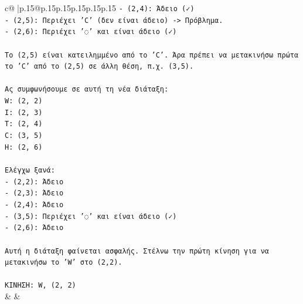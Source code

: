 \documentclass{article}
\begin{document}
{\begin{supertabular}{c@{$\;$}|p{.15\linewidth}@{}p{.15\linewidth}p{.15\linewidth}p{.15\linewidth}p{.15\linewidth}p{.15\linewidth}}
{{{\texttt{{-} (2,4): Άδειο (✓)} \\
\texttt{{-} (2,5): Περιέχει 'C' (δεν είναι άδειο) {-}> Πρόβλημα.} \\
\texttt{{-} (2,6): Περιέχει '◌' και είναι άδειο (✓)} \\
\\ 
\texttt{Το (2,5) είναι κατειλημμένο από το 'C'. Άρα πρέπει να μετακινήσω πρώτα το 'C' από το (2,5) σε άλλη θέση, π.χ. (3,5).} \\
\\ 
\texttt{Ας συμφωνήσουμε σε αυτή τη νέα διάταξη:} \\
\texttt{W: (2, 2)} \\
\texttt{I: (2, 3)} \\
\texttt{T: (2, 4)} \\
\texttt{C: (3, 5)} \\
\texttt{H: (2, 6)} \\
\\ 
\texttt{Ελέγχω ξανά:} \\
\texttt{{-} (2,2): Άδειο} \\
\texttt{{-} (2,3): Άδειο} \\
\texttt{{-} (2,4): Άδειο} \\
\texttt{{-} (3,5): Περιέχει '◌' και είναι άδειο (✓)} \\
\texttt{{-} (2,6): Άδειο} \\
\\ 
\texttt{Αυτή η διάταξη φαίνεται ασφαλής. Στέλνω την πρώτη κίνηση για να μετακινήσω το 'W' στο (2,2).} \\
\\ 
\texttt{ΚΙΝΗΣΗ: W, (2, 2)} \\
            }
        }
    }
    & & \\ \\


\end{supertabular}}
\end{document}
